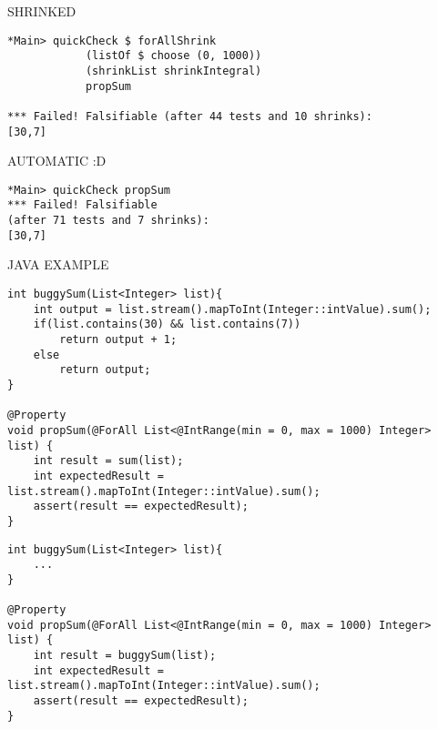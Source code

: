SHRINKED

\begin{verbatim}
*Main> quickCheck $ forAllShrink 
            (listOf $ choose (0, 1000)) 
            (shrinkList shrinkIntegral) 
            propSum

*** Failed! Falsifiable (after 44 tests and 10 shrinks):     
[30,7]
\end{verbatim}

AUTOMATIC :D

\begin{verbatim}
*Main> quickCheck propSum
*** Failed! Falsifiable 
(after 71 tests and 7 shrinks):     
[30,7]
\end{verbatim}

JAVA EXAMPLE

\begin{verbatim}
int buggySum(List<Integer> list){
    int output = list.stream().mapToInt(Integer::intValue).sum();
    if(list.contains(30) && list.contains(7))
        return output + 1;
    else
        return output;
}

@Property
void propSum(@ForAll List<@IntRange(min = 0, max = 1000) Integer> list) {
    int result = sum(list);
    int expectedResult = list.stream().mapToInt(Integer::intValue).sum();
    assert(result == expectedResult);
}
\end{verbatim}

\begin{verbatim}
int buggySum(List<Integer> list){
    ...
}

@Property
void propSum(@ForAll List<@IntRange(min = 0, max = 1000) Integer> list) {
    int result = buggySum(list);
    int expectedResult = list.stream().mapToInt(Integer::intValue).sum();
    assert(result == expectedResult);
}
\end{verbatim}
